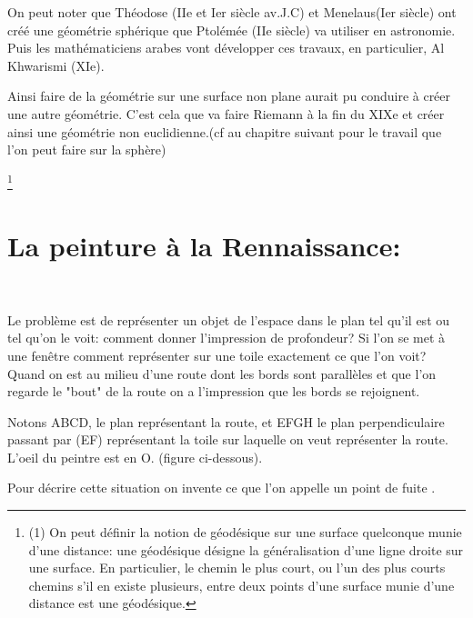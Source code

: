 \documentclass[a4paper, 12pt, twoside]{book}
\begin{document}
    On peut noter que Théodose (IIe et Ier siècle av.J.C) et Menelaus(Ier siècle) ont créé une géométrie sphérique que Ptolémée (IIe siècle) va utiliser en astronomie. Puis les mathématiciens arabes vont développer ces travaux, en particulier, Al Khwarismi (XIe).\bigskip
    
    Ainsi faire de la géométrie sur une surface non plane aurait pu conduire à créer une autre géométrie. C'est cela que va faire Riemann à la fin du XIXe et créer ainsi une géométrie non euclidienne.(cf au chapitre suivant pour  le travail que l'on peut faire sur la sphère) \bigskip
 
 
 
    
  \footnote{ (1) On peut définir la notion de géodésique sur une surface quelconque munie d'une distance: une géodésique désigne la généralisation d'une ligne droite sur une surface. En particulier, le chemin le plus court, ou l'un des plus courts chemins s'il en existe plusieurs, entre deux  points d'une surface munie d'une distance est une géodésique. }   

 
   
    
   
    
    
   \newpage  \section{La peinture à la Rennaissance:}\
    
    
    
   
    
     Le problème est de représenter un objet de l'espace dans le plan tel qu'il est ou tel qu'on le voit: comment donner l'impression de profondeur?
   Si l'on se met à une fenêtre comment représenter sur une toile exactement ce que l'on voit? Quand on est au milieu d'une route dont les bords sont parallèles et que l'on  regarde le "bout" de la route on a l'impression que les bords se rejoignent.\
   
    Notons ABCD, le plan représentant la route, et EFGH le plan perpendiculaire passant par (EF) représentant la toile sur laquelle on veut représenter la route. L'oeil du peintre est en O. (figure ci-dessous).
 
  Pour décrire cette situation on invente ce que l'on appelle un point de fuite .
  
\end{document}
